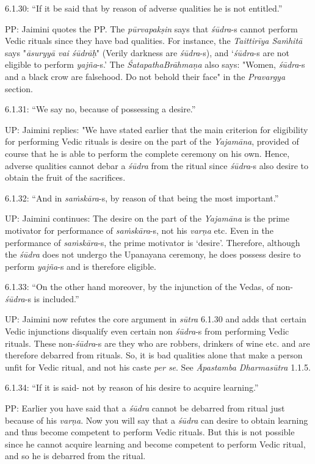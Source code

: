 6.1.30: “If it be said that by reason of adverse qualities he is not entitled.”

PP: Jaimini quotes the PP. The \textit{pūrvapakṣin} says that \textit{śūdra}-s cannot perform Vedic rituals since they have bad qualities. For instance, the \textit{Taittirīya Saṁhitā} says "\textit{āsuryyā vai śūdrāḥ}" (Verily darkness are \textit{śūdra}-s), and ‘\textit{śūdra}-s are not eligible to perform \textit{yajña}-s.’ The \textit{ŚatapathaBrāhmaṇa} also says: "Women, \textit{śūdra}-s and a black crow are falsehood. Do not behold their face" in the \textit{Pravargya} section.

6.1.31: “We say no, because of possessing a desire.”

UP: Jaimini replies: "We have stated earlier that the main criterion for eligibility for performing Vedic rituals is desire on the part of the \textit{Yajamāna}, provided of course that he is able to perform the complete ceremony on his own. Hence, adverse qualities cannot debar a \textit{śūdra} from the ritual since \textit{śūdra}-s also desire to obtain the fruit of the sacrifices.

6.1.32: “And in \textit{saṁskāra}-s, by reason of that being the most important.”

UP: Jaimini continues: The desire on the part of the \textit{Yajamāna} is the prime motivator for performance of \textit{saṁskāra}-s, not his \textit{varṇa }etc. Even in the performance of \textit{saṁskāra}-s, the prime motivator is ‘desire’. Therefore, although the \textit{śūdra} does not undergo the Upanayana ceremony, he does possess desire to perform \textit{yajña}-s and is therefore eligible.

6.1.33: “On the other hand moreover, by the injunction of the Vedas, of non-\textit{śūdra}-s is included.”

UP: Jaimini now refutes the core argument in \textit{sūtra} 6.1.30 and adds that certain Vedic injunctions disqualify even certain non \textit{śūdra}-s from performing Vedic rituals. These non-\textit{śūdra}-s are they who are robbers, drinkers of wine etc. and are therefore debarred from rituals. So, it is bad qualities alone that make a person unfit for Vedic ritual, and not his caste \textit{per se}. See \textit{Āpastamba Dharmasūtra} 1.1.5.

6.1.34: “If it is said- not by reason of his desire to acquire learning.”

PP: Earlier you have said that a \textit{śūdra} cannot be debarred from ritual just because of his \textit{varṇa}. Now you will say that a \textit{śūdra} can desire to obtain learning and thus become competent to perform Vedic rituals. But this is not possible since he cannot acquire learning and become competent to perform Vedic ritual, and so he is debarred from the ritual.

